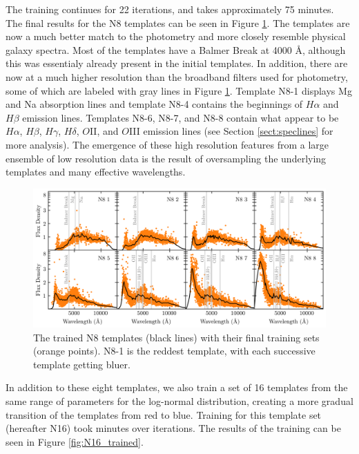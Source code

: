 The training continues for 22 iterations, and takes approximately 75 minutes.
The final results for the N8 templates can be seen in Figure \ref{fig:N8_trained}.
The templates are now a much better match to the photometry and more closely resemble physical galaxy spectra.
Most of the templates have a Balmer Break at 4000 \AA, although this was essentialy already present in the initial templates.
In addition, there are now at a much higher resolution than the broadband filters used for photometry, some of which are labeled with gray lines in Figure \ref{fig:N8_trained}.
Template N8-1 displays Mg and Na absorption lines and template N8-4 contains the beginnings of $H\alpha$ and $H\beta$ emission lines.
Templates N8-6, N8-7, and N8-8 contain what appear to be $H\alpha$, $H\beta$, $H\gamma$, $H\delta$, $O$II, and $O$III emission lines (see Section \ref{sect:speclines} for more analysis).
The emergence of these high resolution features from a large ensemble of low resolution data is the result of oversampling the underlying templates and many effective wavelengths. 

\begin{figure}
    \centering
    \includegraphics{figures/N8_trained.png}
    \caption{The trained N8 templates (black lines) with their final training sets (orange points). N8-1 is the reddest template, with each successive template getting bluer. }
    \label{fig:N8_trained}
\end{figure}

In addition to these eight templates, we also train a set of 16 templates from the same range of parameters for the log-normal distribution, creating a more gradual transition of the templates from red to blue. 
Training for this template set (hereafter N16) took  minutes over  iterations.
The results of the training can be seen in Figure \ref{fig:N16_trained}.

